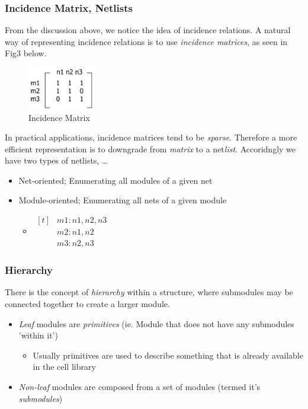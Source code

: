\documentclass{article}
\begin{document}
\subsubsection{Incidence Matrix, Netlists}
From the discussion above, we notice the idea of incidence relations. 
A natural way of representing incidence relations is to use \textit{incidence matrices}, as seen in Fig3 below.

\begin{figure}[htp]
    \centering
    \includegraphics[width=3cm, scale=1]{S1/incidenceMatrix.PNG}
    \caption{Incidence Matrix}
\end{figure}

In practical applications, incidence matrices tend to be \textit{sparse}.
Therefore a more efficient representation is to downgrade from \textit{matrix} to a net\textit{list}. Accoridngly we have two types of netlists, \dots
\begin{itemize}
    \item Net-oriented; Enumerating all modules of a given net
    \item Module-oriented; Enumerating all nets of a given module
        \begin{itemize}
            \item {}
                    $ \begin{aligned}[t]
                    &m1:n1,n2,n3\\
                    &m2:n1,n2\\
                    &m3:n2,n3
                    \end{aligned} $ 
        \end{itemize}
\end{itemize}

\subsubsection{Hierarchy}
There is the concept of \textit{hierarchy} within a structure, where submodules may be connected together to create a larger module.
\begin{itemize}
    \item \textit{Leaf} modules are \textit{primitives} (ie. Module that does not have any submodules 'within it')
        \begin{itemize}
            \item Usually primitives are used to describe something that is already available in the cell library
        \end{itemize}
    \item \textit{Non-leaf} modules are composed from a set of modules (termed it's \textit{submodules})
\end{itemize}
\end{document}

